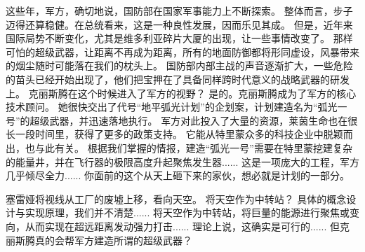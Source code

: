 \documentclass[openany]{book}
\begin{document}
\begin{dialogue}
     这些年，军方，确切地说，国防部在国家军事能力上不断探索。
     整体而言，步子迈得还算稳健。在总统看来，这是一种良性发展，因而乐见其成。
     但是，近年来国际局势不断变化，尤其是维多利亚碎片大厦的出现，让一些事情改变了。
     那样可怕的超级武器，让距离不再成为距离，所有的地面防御都将形同虚设，风暴带来的烟尘随时可能落在我们的枕头上。
     国防部内部主战的声音逐渐扩大，一些危险的苗头已经开始出现了，他们把宝押在了具备同样跨时代意义的战略武器的研发上。
     克丽斯腾在这个时候进入了军方的视野？
     是的。克丽斯腾成为了军方的核心技术顾问。
     她很快交出了代号“地平弧光计划”的企划案，计划建造名为“弧光一号”的超级武器，并迅速落地执行。
     军方对此投入了大量的资源，莱茵生命也在很长一段时间里，获得了更多的政策支持。
     它能从特里蒙众多的科技企业中脱颖而出，也与此有关。
     根据我们掌握的情报，建造“弧光一号”需要在特里蒙挖建复杂的能量井，并在飞行器的极限高度升起聚焦发生器......
     这是一项庞大的工程，军方几乎倾尽全力......
     你面前的这个从天上砸下来的家伙，想必就是计划的一部分。\par
    塞雷娅将视线从工厂的废墟上移，看向天空。
     将天空作为中转站？
     具体的概念设计与实现原理，我们并不清楚......
     将天空作为中转站，将巨量的能源进行聚焦或变向，从而实现在超远距离发动强力打击......
     理论上说，这确实是可行的......
     但克丽斯腾真的会帮军方建造所谓的超级武器？
\end{dialogue}
\end{document}
